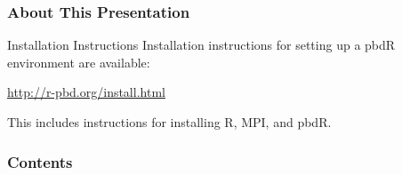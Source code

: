 \begin{frame}
\frametitle{About This Presentation}
 \begin{block}{Installation Instructions}
  Installation instructions for setting up a pbdR environment are available:
  \begin{center}
  \url{http://r-pbd.org/install.html}
  \end{center}
  This includes instructions for installing R, MPI, and pbdR.
 \end{block}
\end{frame}



\begin{frame}[noframenumbering]
\frametitle{Contents}
\small
\tableofcontents[hideallsubsections]
\end{frame}

\setcounter{framenumber}{0}
